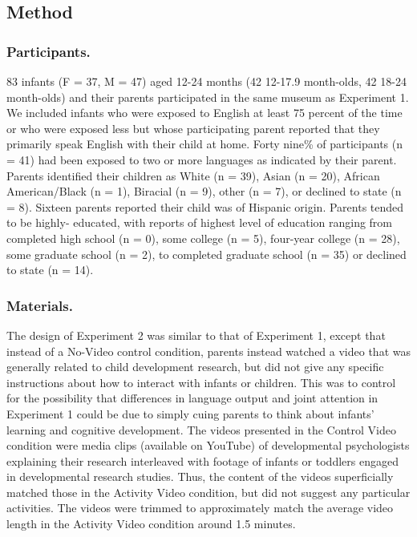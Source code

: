 \documentclass[10pt, letterpaper]{article}
\begin{document}
\subsection{Method}\label{method-1}

\subsubsection{Participants.}\label{participants.-1}

83 infants (F = 37, M = 47) aged 12-24 months (42 12-17.9 month-olds, 42
18-24 month-olds) and their parents participated in the same museum as
Experiment 1. We included infants who were exposed to English at least
75 percent of the time or who were exposed less but whose participating
parent reported that they primarily speak English with their child at
home. Forty nine\% of participants (n = 41) had been exposed to two or
more languages as indicated by their parent. Parents identified their
children as White (n = 39), Asian (n = 20), African American/Black (n =
1), Biracial (n = 9), other (n = 7), or declined to state (n = 8).
Sixteen parents reported their child was of Hispanic origin. Parents
tended to be highly- educated, with reports of highest level of
education ranging from completed high school (n = 0), some college (n =
5), four-year college (n = 28), some graduate school (n = 2), to
completed graduate school (n = 35) or declined to state (n = 14).

\subsubsection{Materials.}\label{materials.-1}

The design of Experiment 2 was similar to that of Experiment 1, except
that instead of a No-Video control condition, parents instead watched a
video that was generally related to child development research, but did
not give any specific instructions about how to interact with infants or
children. This was to control for the possibility that differences in
language output and joint attention in Experiment 1 could be due to
simply cuing parents to think about infants' learning and cognitive
development. The videos presented in the Control Video condition were
media clips (available on YouTube) of developmental psychologists
explaining their research interleaved with footage of infants or
toddlers engaged in developmental research studies. Thus, the content of
the videos superficially matched those in the Activity Video condition,
but did not suggest any particular activities. The videos were trimmed
to approximately match the average video length in the Activity Video
condition around 1.5 minutes.
\end{document}
